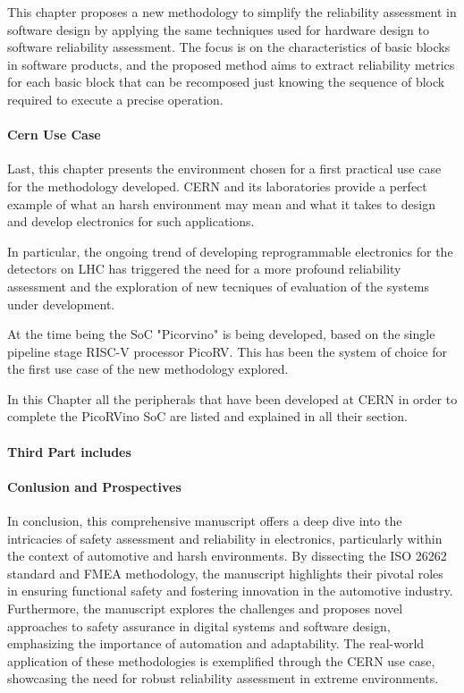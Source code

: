 \documentclass[./dissertation.tex]{subfiles}
\begin{document}
This chapter proposes a new methodology to simplify the reliability assessment in software design by applying the same techniques used for hardware design to software reliability assessment. The focus is on the characteristics of basic blocks in software products, and the proposed method aims to extract reliability metrics for each basic block that can be recomposed just knowing the sequence of block required to execute a precise operation.
\paragraph{Cern Use Case}
Last, this chapter presents the environment chosen for a first practical use case for the methodology developed. CERN and its laboratories provide a perfect example of what an harsh environment may mean and what it takes to design and develop electronics for such applications.

In particular, the ongoing trend of developing reprogrammable electronics for the detectors on LHC has triggered the need for a more profound reliability assessment and the exploration of new tecniques of evaluation of the systems under development.

At the time being the SoC "Picorvino" is being developed, based on the single pipeline stage RISC-V processor PicoRV. This has been the system of choice for the first use case of the new methodology explored.

In this Chapter all the peripherals that have been developed at CERN in order to complete the PicoRVino SoC are listed and explained in all their section.

\noindent \paragraph{Third Part includes}


\paragraph{Conlusion and Prospectives}
In conclusion, this comprehensive manuscript offers a deep dive into the intricacies of safety assessment and reliability in electronics, particularly within the context of automotive and harsh environments. By dissecting the ISO 26262 standard and FMEA methodology, the manuscript highlights their pivotal roles in ensuring functional safety and fostering innovation in the automotive industry. Furthermore, the manuscript explores the challenges and proposes novel approaches to safety assurance in digital systems and software design, emphasizing the importance of automation and adaptability. The real-world application of these methodologies is exemplified through the CERN use case, showcasing the need for robust reliability assessment in extreme environments.
\end{document}
